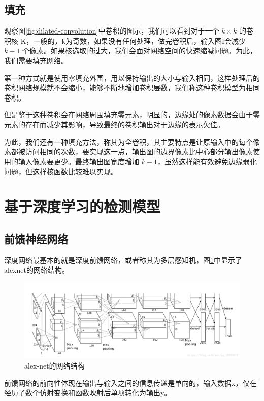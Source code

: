 \subsection{填充}

观察图\ref{fig:dilated-convolution}中卷积的图示，我们可以看到对于一个 $ k \times k $ 的卷积核 K，一般的，k为奇数，如果没有任何处理，做完卷积后，输入图I会减少 $ k - 1 $ 个像素。如果核选取的过大，我们会面对网络空间的快速缩减问题。为此，我们需要填充网络。

第一种方式就是使用零填充外围，用以保持输出的大小与输入相同，这样处理后的卷积网络规模就不会缩小，能够不断地增加卷积层数，我们称这种卷积模型为相同卷积。

但是鉴于这种卷积会在网络周围填充零元素，明显的，边缘处的像素数据会由于零元素的存在而减少其影响，导致最终的卷积输出对于边缘的表示欠佳。

为此，我们还有一种填充方法，称其为全卷积，其主要特点是让原输入中的每个像素都被访问相同的次数，要实现这一点，输出图的边界像素比中心部分输出像素使用的输入像素要更少。最终输出图宽度增加 $ k-1 $，虽然这样能有效避免边缘弱化问题，但这样核函数比较难以实现。


\section{基于深度学习的检测模型}

\subsection{前馈神经网络}
深度网络最基本的就是深度前馈网络，或者称其为多层感知机，图\ref{fig:alex-net}中显示了alexnet的网络结构。

\begin{figure}[!tbp]
    \centering
    \includegraphics[width=\textwidth]{figures/alex-net.png}
    \caption{alex-net的网络结构\cite{NIPS2012_4824}}
    \vspace{-1em}
    \label{fig:alex-net}
\end{figure}

前馈网络的前向性体现在输出与输入之间的信息传递是单向的，输入数据x，仅在经历了数个仿射变换和函数映射后单项转化为输出y。

